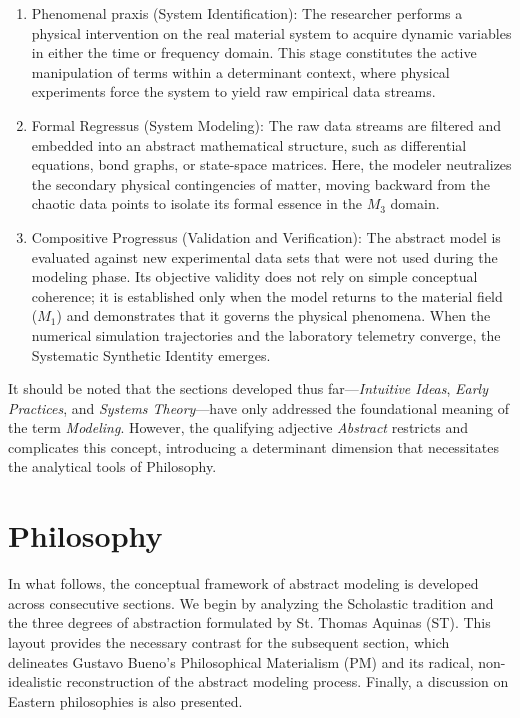 \documentclass[11pt, a4paper]{article}
\begin{document}
\begin{enumerate}
    \item {Phenomenal praxis (System Identification):} The researcher performs a physical intervention on the real material system to acquire dynamic variables in either the time or frequency domain. This stage constitutes the active manipulation of terms within a determinant context, where physical experiments force the system to yield raw empirical data streams.
    \item {Formal Regressus (System Modeling):} The raw data streams are filtered and embedded into an abstract mathematical structure, such as differential equations, bond graphs, or state-space matrices. Here, the modeler neutralizes the secondary physical contingencies of matter, moving backward from the chaotic data points to isolate its formal essence in the $M_3$ domain.
    \item {Compositive Progressus (Validation and Verification):} The abstract model is evaluated against new experimental data sets that were not used during the modeling phase. Its objective validity does not rely on simple conceptual coherence; it is established only when the model returns to the material field ($M_1$) and demonstrates that it governs the physical phenomena. When the numerical simulation trajectories and the laboratory telemetry converge, the Systematic Synthetic Identity emerges.
\end{enumerate}

It should be noted that the sections developed thus far---\textit{Intuitive Ideas}, \textit{Early Practices}, and \textit{Systems Theory}---have only addressed the foundational meaning of the term \textit{Modeling}. However, the qualifying adjective \textit{Abstract} restricts and complicates this concept, introducing a determinant dimension that necessitates the analytical tools of Philosophy.


\section{Philosophy}

In what follows, the conceptual framework of abstract modeling is developed across consecutive sections. We begin by analyzing the Scholastic tradition and the three degrees of abstraction formulated by St. Thomas Aquinas (ST). This layout provides the necessary contrast for the subsequent section, which delineates Gustavo Bueno's Philosophical Materialism (PM) and its radical, non-idealistic reconstruction of the abstract modeling process. Finally, a discussion on Eastern philosophies is also presented.
\end{document}

